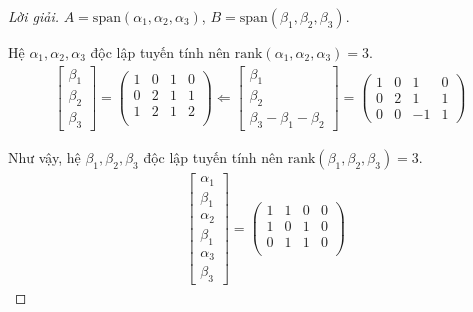 \documentclass[class=linearalgebra,crop=false]{standalone}
\begin{document}
\begin{proof}[Lời giải]$A = \text{span}(\alpha_{1},\alpha_{2},\alpha_{3})$, $B = \text{span}(\beta_{1},\beta_{2},\beta_{3})$.
    \par Hệ $\alpha_{1}, \alpha_{2}, \alpha_{3}$ độc lập tuyến tính nên $\text{rank}(\alpha_{1}, \alpha_{2}, \alpha_{3}) = 3$.
    \begin{align*}
        \begin{bmatrix}
            \beta_{1} \\
            \beta_{2} \\
            \beta_{3}
        \end{bmatrix}=
        \begin{pmatrix}
            1 & 0 & 1 & 0 \\
            0 & 2 & 1 & 1 \\
            1 & 2 & 1 & 2 \\
        \end{pmatrix}
        \Longleftarrow
        \begin{bmatrix}
            \beta_{1} \\
            \beta_{2} \\
            \beta_{3} - \beta_{1} - \beta_{2}
        \end{bmatrix}=
        \begin{pmatrix}
            1 & 0 & 1 & 0 \\
            0 & 2 & 1 & 1 \\
            0 & 0 & -1 & 1
        \end{pmatrix}
    \end{align*}
    \par Như vậy, hệ $\beta_{1}, \beta_{2}, \beta_{3}$ độc lập tuyến tính nên $\text{rank}(\beta_{1}, \beta_{2}, \beta_{3}) = 3$.
    \begin{align*}
        &\begin{bmatrix}
            \alpha_{1} \\
            \beta_{1} \\
            \alpha_{2} \\
            \beta_{1} \\
            \alpha_{3} \\
            \beta_{3}
        \end{bmatrix}=
        \begin{pmatrix}
            1 & 1 & 0 & 0 \\
            1 & 0 & 1 & 0 \\
            0 & 1 & 1 & 0 \\

\end{pmatrix}
\end{align*}
\end{proof}
\end{document}
